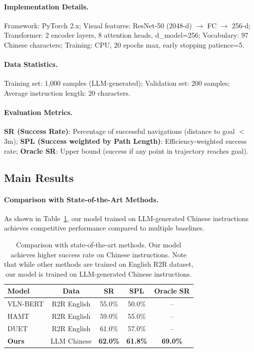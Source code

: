 \documentclass[11pt,a4paper]{article}
\begin{document}
\paragraph{Implementation Details.}
Framework: PyTorch 2.x; Visual features: ResNet-50 (2048-d) $\rightarrow$ FC $\rightarrow$ 256-d; Transformer: 2 encoder layers, 8 attention heads, d\_model=256; Vocabulary: 97 Chinese characters; Training: CPU, 20 epochs max, early stopping patience=5.

\paragraph{Data Statistics.}
Training set: 1,000 samples (LLM-generated); Validation set: 200 samples; Average instruction length: 20 characters.

\paragraph{Evaluation Metrics.}
\textbf{SR (Success Rate)}: Percentage of successful navigations (distance to goal $<$ 3m);
\textbf{SPL (Success weighted by Path Length)}: Efficiency-weighted success rate;
\textbf{Oracle SR}: Upper bound (success if any point in trajectory reaches goal).

\subsection{Main Results}

\paragraph{Comparison with State-of-the-Art Methods.}
As shown in Table~\ref{tab:main-results}, our model trained on LLM-generated Chinese instructions achieves competitive performance compared to multiple baselines.

\begin{table}[t]
\centering
\small
\begin{tabular}{lcccc}
\toprule
\textbf{Model} & \textbf{Data} & \textbf{SR} & \textbf{SPL} & \textbf{Oracle SR} \\
\midrule
VLN-BERT \cite{hong2021vln} & R2R English & 55.0\% & 50.0\% & -- \\
HAMT \cite{chen2021hamt} & R2R English & 59.0\% & 55.0\% & -- \\
DUET \cite{duet2022} & R2R English & 61.0\% & 57.0\% & -- \\
\midrule
\textbf{Ours} & LLM Chinese & \textbf{62.0\%} & \textbf{61.8\%} & \textbf{69.0\%} \\
\bottomrule
\end{tabular}
\caption{Comparison with state-of-the-art methods. Our model achieves higher success rate on Chinese instructions. Note that while other methods are trained on English R2R dataset, our model is trained on LLM-generated Chinese instructions.}
\label{tab:main-results}
\end{table}
\end{document}
